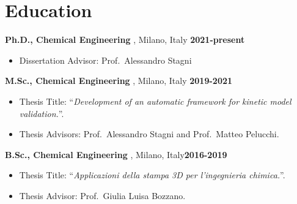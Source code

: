 \section{\sc Education}

{\bf Ph.D., Chemical Engineering} \polimi, Milano, Italy \hfill {\bf 2021-present}\\
\vspace*{-.1in}
\begin{itemize}
    \item[ ] Dissertation Advisor: Prof.\ Alessandro Stagni
\end{itemize}

{\bf M.Sc., Chemical Engineering} \polimi, Milano, Italy \hfill {\bf 2019-2021}\\
\vspace*{-.1in}
\begin{itemize}
    \item[ ] Thesis Title: ``{\it Development of an automatic framework for kinetic model validation.}''.
    \item[ ] Thesis Advisors: Prof.\ Alessandro Stagni and Prof.\ Matteo Pelucchi.
\end{itemize}

{\bf B.Sc., Chemical Engineering} \polimi, Milano, Italy\hfill {\bf 2016-2019}\\
\vspace*{-.1in}
\begin{itemize}
    \item[ ] Thesis Title: ``{\it Applicazioni della stampa 3D per l'ingegnieria chimica.}''.
    \item[ ] Thesis Advisor: Prof.\ Giulia Luisa Bozzano.
\end{itemize}


